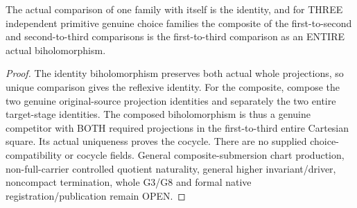 \begin{theorem}
\label{hir:submersion-cartesian-choice-cocycle}
\leanok
{}
The actual comparison of one family with itself is the identity, and for
THREE independent primitive genuine choice families the composite of the
first-to-second and second-to-third comparisons is the first-to-third
comparison as an ENTIRE actual biholomorphism.
\end{theorem}
\begin{proof}
The identity biholomorphism preserves both actual whole projections, so
unique comparison gives the reflexive identity. For the composite, compose
the two genuine original-source projection identities and separately the
two entire target-stage identities. The composed biholomorphism is thus a
genuine competitor with BOTH required projections in the first-to-third
entire Cartesian square. Its actual uniqueness proves the cocycle. There
are no supplied choice-compatibility or cocycle fields. General composite-submersion
chart production, non-full-carrier controlled quotient naturality, general
higher invariant/driver, noncompact termination, whole G3/G8 and formal
native registration/publication remain OPEN.
\end{proof}
